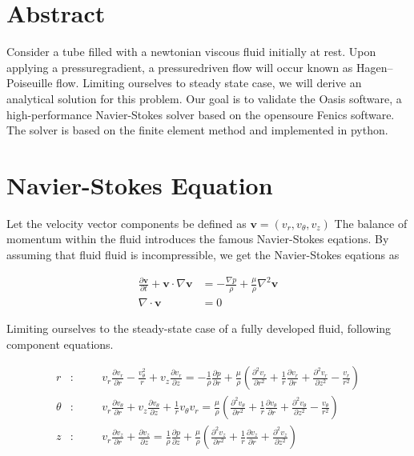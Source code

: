 \documentclass[a4paper,norsk]{article}
\begin{document}
\maketitle

\section*{Abstract}
Consider a tube filled with a newtonian viscous fluid initially at rest. Upon applying a pressuregradient, a
pressuredriven flow will occur known as Hagen–Poiseuille flow. Limiting ourselves to steady state case,
we will derive an analytical solution for this problem. Our goal is to validate the Oasis software,
a high-performance Navier-Stokes solver based on the opensoure Fenics software. The solver is based on the finite element method and
implemented in python.

\section*{Navier-Stokes Equation}
Let the velocity vector components be defined as $\textbf{v} = (v_r, v_\theta, v_z)$
The balance of momentum within the fluid introduces the famous Navier-Stokes eqations. By assuming
that fluid fluid is incompressible, we get the Navier-Stokes eqations as

\begin{align}
\frac{\partial \textbf{v}}{\partial t} + \textbf{v} \cdot \nabla \textbf{v} &=
-\frac{\nabla p}{\rho} + \frac{\mu}{\rho} \nabla^2 \textbf{v} \\
\nabla \cdot \textbf{v} &= 0
\end{align}

Limiting ourselves to the steady-state case of a fully developed fluid, following component equations.

\begin{align}
r &: \hspace{1cm} v_r\frac{\partial v_r}{\partial r} - \frac{v_\theta^2}{r} + v_z\frac{\partial v_r}{\partial z}
= -\frac{1}{\rho} \frac{\partial p}{\partial r} + \frac{\mu}{\rho}( \frac{\partial^2 v_r}{\partial r^2} +
\frac{1}{r} \frac{\partial v_r}{\partial r} + \frac{\partial^2 v_r}{\partial z^2} - \frac{v_r}{r^2} ) \\
\theta &: \hspace{1cm} v_r\frac{\partial v_\theta}{\partial r} + v_z\frac{\partial v_\theta}{\partial z} +
\frac{1}{r}v_\theta v_r = \frac{\mu}{\rho} (\frac{\partial^2 v_\theta}{\partial r^2} +
\frac{1}{r} \frac{\partial v_\theta}{\partial r} + \frac{\partial^2 v_\theta}{\partial z^2} -
\frac{v_\theta}{r^2} ) \\
z &: \hspace{1cm} v_r \frac{\partial v_z}{\partial r} + \frac{\partial v_z}{\partial z} =
\frac{1}{\rho} \frac{\partial p}{\partial z} + \frac{\mu}{\rho} (\frac{\partial^2 v_z}{\partial r^2} +
\frac{1}{r} \frac{\partial v_z}{\partial r} + \frac{\partial^2 v_z}{\partial z^2}
)
\end{align}
\end{document}
